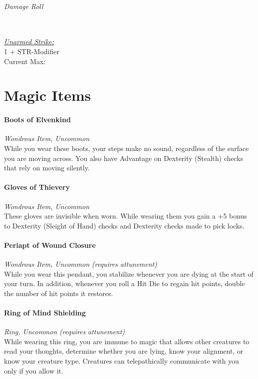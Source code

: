 \documentclass[letterpaper,openany,oneside,twocolumn]{book}
\newcommand{\PATH}{../../../}
\begin{document}
\paragraph*{Damage Roll}\hfill\\
\underline{\textit{Unarmed Strike:}}\\
1 + STR-Modifier\\
\indent Current Max: 

\part*{Magic Items}



\newpage
\subsection*{Boots of Elvenkind}
\textit{Wondrous Item, Uncommon}\\
While you wear these boots, your steps make no sound, regardless of the surface you are moving across. You also have Advantage on Dexterity (Stealth) checks that rely on moving silently.

\subsection*{Gloves of Thievery}
\textit{Wondrous Item, Uncommon}\\
These gloves are invisible when worn. While wearing them you gain a +5 bonus to Dexterity (Sleight of Hand) checks and Dexterity checks made to pick locks.

\subsection*{Periapt of Wound Closure}
\textit{Wondrous Item, Uncommon (requires attunement)}\\
While you wear this pendant, you stabilize whenever you are dying at the start of your turn. In addition, whenever you roll a Hit Die to regain hit points, double the number of hit points it restores.

\subsection*{Ring of Mind Shielding}
\textit{Ring, Uncommon (requires attunement)}\\
While wearing this ring, you are immune to magic that allows other creatures to read your thoughts, determine whether you are lying, know your alignment, or know your creature type. Creatures can telepathically communicate with you only if you allow it.
\end{document}
